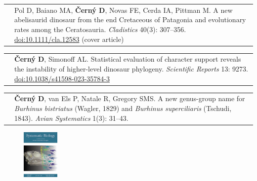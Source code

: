 \documentclass[10pt]{article}
\begin{document}
\noindent \begin{tabularx}{\textwidth}{>{\raggedleft\arraybackslash}p{2.2cm} p{10.5cm}}
2024 & Pol D, Baiano MA, \textbf{\v{C}ern\'{y} D}, Novas FE, Cerda IA, Pittman M. A new abelisaurid dinosaur from the end Cretaceous of Patagonia and evolutionary rates among the Ceratosauria. \textit{Cladistics} 40(3): 307--356. \href{http://doi.org/10.1111/cla.12583}{doi:10.1111/cla.12583} (cover article)
\end{tabularx}
\noindent \begin{tabularx}{\textwidth}{>{\raggedleft\arraybackslash}p{2.2cm} p{10.5cm}}
2023 & \textbf{\v{C}ern\'{y} D}, Simonoff AL. Statistical evaluation of character support reveals the instability of higher-level dinosaur phylogeny. \textit{Scientific Reports} 13: 9273. \href{http://doi.org/10.1038/s41598-023-35784-3}{doi:10.1038/s41598-023-35784-3}
\end{tabularx}
\noindent \begin{tabularx}{\textwidth}{>{\raggedleft\arraybackslash}p{2.2cm} p{10.5cm}}
2023 & \textbf{\v{C}ern\'{y} D}, van Els P, Natale R, Gregory SMS. A new genus-group name for \textit{Burhinus bistriatus} (Wagler, 1829) and \textit{Burhinus superciliaris} (Tschudi, 1843). \textit{Avian Systematics} 1(3): 31--43.
\end{tabularx}

\begin{figure}
 \vspace*{-10.2cm}
 \begin{center}
   \includegraphics[width=0.16\textwidth]{SysBioCover.png}
 \end{center}
\end{figure}
\end{document}
